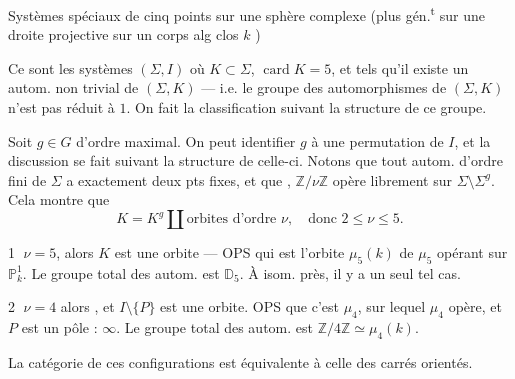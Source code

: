 Systèmes spéciaux de cinq points sur une sphère complexe (plus gén.\textsuperscript{t} sur une  droite projective sur un corps alg clos \(k\) )

Ce sont les systèmes \((\Sigma,I)\) où \(K\subset\Sigma\), \(\operatorname{card}K=5\), et tels qu’il existe un autom. non trivial de \((\Sigma,K)\) --- i.e. le groupe  des automorphismes de \((\Sigma,K)\) n’est pas réduit à \(1\). On fait la classification suivant la structure de ce groupe.

Soit \(g\in G\) d’ordre maximal. On peut identifier \(g\) à une permutation de \(I\), et la discussion se fait suivant la structure de celle-ci. Notons que  tout autom. d’ordre fini de \(\Sigma\)  a exactement deux pts fixes, et que  , \(\mathbb Z/\nu\mathbb Z\) opère librement sur \(\Sigma\setminus\Sigma^g\). Cela montre que
\[
K=K^g\amalg\text{orbites d’ordre }\nu,\quad\text{donc }2\leq\nu\leq5.
\]

\textcircled{1} \(\nu=5\), alors \(K\) est une orbite --- OPS qui est l’orbite \(\mu_5(k)\) de \(\mu_5\) opérant sur \(\mathbb P^1_k\). Le groupe total des autom. est \(\mathbb D_5\). À isom. près, il y a un seul tel cas.


\textcircled{2} \(\nu=4\) alors  , et \(I\setminus\{P\}\) est une orbite. OPS que c’est \(\mu_4\), sur lequel \(\mu_4\) opère, et \(P\) est un pôle : \(\infty\). Le groupe total des autom. est \(\mathbb Z/4\mathbb Z\simeq\mu_4(k)\).

La catégorie de ces configurations est équivalente à celle des carrés orientés.


